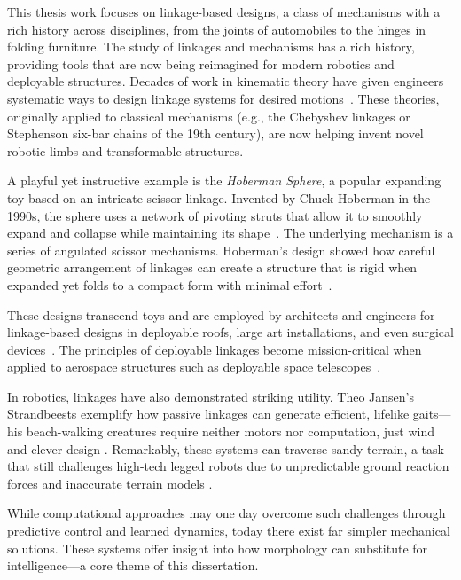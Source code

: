 This thesis work focuses on linkage-based designs, a class of mechanisms with a rich history across disciplines, from the joints of automobiles to the hinges in folding furniture. The study of linkages and mechanisms has a rich history, providing tools that are now being reimagined for modern robotics and deployable structures. Decades of work in kinematic theory have given engineers systematic ways to design linkage systems for desired motions~\cite{GeometricBooks}. These theories, originally applied to classical mechanisms (e.g., the Chebyshev linkages or Stephenson six-bar chains of the 19th century), are now helping invent novel robotic limbs and transformable structures.

A playful yet instructive example is the \textit{Hoberman Sphere}, a popular expanding toy based on an intricate scissor linkage. Invented by Chuck Hoberman in the 1990s, the sphere uses a network of pivoting struts that allow it to smoothly expand and collapse while maintaining its shape~\cite{hoberman1990reversibly}. The underlying mechanism is a series of angulated scissor mechanisms. Hoberman’s design showed how careful geometric arrangement of linkages can create a structure that is rigid when expanded yet folds to a compact form with minimal effort~\cite{hoberman2006design, WANG2024112557}.

These designs transcend toys and are employed by architects and engineers for linkage-based designs in deployable roofs, large art installations, and even surgical devices~\cite{wang_space_2024, liao_deployable_2024, fenci_deployable_2017, zhang_deployable_2021, moy_state--art_2022, maden_review_2011}. The principles of deployable linkages become mission-critical when applied to aerospace structures such as deployable space telescopes~\cite{puig_review_2010, lightsey_james_2012}.

In robotics, linkages have also demonstrated striking utility. Theo Jansen’s Strandbeests exemplify how passive linkages can generate efficient, lifelike gaits—his beach-walking creatures require neither motors nor computation, just wind and clever design \cite{Jansen1990Strandbeast}. Remarkably, these systems can traverse sandy terrain, a task that still challenges high-tech legged robots due to unpredictable ground reaction forces and inaccurate terrain models \cite{doi:10.1126/science.1229163}.

While computational approaches may one day overcome such challenges through predictive control and learned dynamics, today there exist far simpler mechanical solutions. These systems offer insight into how morphology can substitute for intelligence—a core theme of this dissertation.

